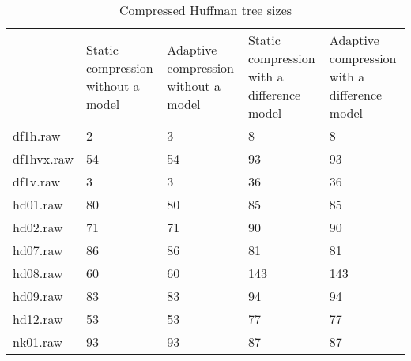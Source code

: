 \begin{table}
\caption{Compressed Huffman tree sizes}
\begin{tabular}{lllll}
 & Static compression without a model & Adaptive compression without a model & Static compression with a difference model & Adaptive compression with a difference model \\
df1h.raw & 2 & 3 & 8 & 8 \\
df1hvx.raw & 54 & 54 & 93 & 93 \\
df1v.raw & 3 & 3 & 36 & 36 \\
hd01.raw & 80 & 80 & 85 & 85 \\
hd02.raw & 71 & 71 & 90 & 90 \\
hd07.raw & 86 & 86 & 81 & 81 \\
hd08.raw & 60 & 60 & 143 & 143 \\
hd09.raw & 83 & 83 & 94 & 94 \\
hd12.raw & 53 & 53 & 77 & 77 \\
nk01.raw & 93 & 93 & 87 & 87 \\
\end{tabular}
\end{table}
